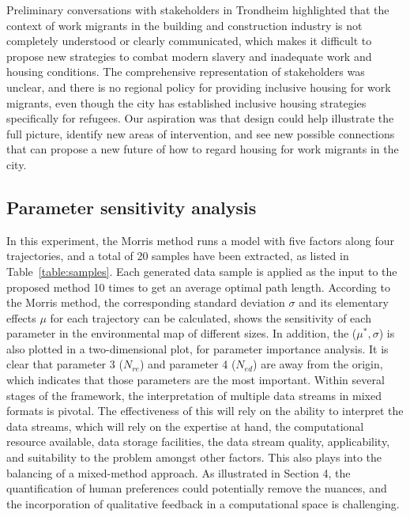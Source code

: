 \documentclass{PDS}%
\theoremstyle{definition}
\begin{document}
Preliminary conversations with stakeholders in Trondheim highlighted that the context of work migrants
in the building and construction industry is not completely understood or clearly communicated, which
makes it difficult to propose new strategies to combat modern slavery and inadequate work and housing
conditions. The comprehensive representation of stakeholders was unclear, and there is no regional
policy for providing inclusive housing for work migrants, even though the city has established inclusive
housing strategies specifically for refugees. Our aspiration was that design could help illustrate the full
picture, identify new areas of intervention, and see new possible connections that can propose a new
future of how to regard housing for work migrants in the city.


\subsection{Parameter sensitivity analysis}

 In this experiment, the
Morris method runs a model with five factors along four trajectories, and a total of 20 samples have
been extracted, as listed in Table~\ref{table:samples}. Each generated data sample is
applied as the input to the proposed method 10 times to get an average optimal path
length. According to the Morris method, the
corresponding standard deviation $\sigma$ and its elementary effects $\mu$ for each
trajectory can be calculated, shows the sensitivity of each parameter in the environmental map of different sizes. In
addition, the ($\mu^*,\sigma$) is also plotted in a two-dimensional plot, for parameter importance analysis. It is clear that parameter 3
($N_{re}$) and parameter 4 ($N_{ed}$) are away from the origin, which indicates that
those parameters are the most important.
Within several stages of the framework, the interpretation of
multiple data streams in mixed formats is pivotal. The effectiveness of this will rely on the ability to
interpret the data streams, which will rely on the expertise at hand, the computational resource available,
data storage facilities, the data stream quality, applicability, and suitability to the problem amongst other
factors. This also plays into the balancing of a mixed-method approach. As illustrated in Section 4, the
quantification of human preferences could potentially remove the nuances, and the incorporation of
qualitative feedback in a computational space is challenging.
\end{document}
